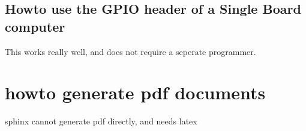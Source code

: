 \documentclass[letterpaper,10pt,english]{sphinxmanual}
\begin{document}
\subsection{Howto use the GPIO header of a Single Board computer}
\label{\detokenize{hacking/openocd:howto-use-the-gpio-header-of-a-single-board-computer}}
This works really well, and does not require a seperate programmer.

\begin{sphinxVerbatim}[commandchars=\\\{\}]
         
\end{sphinxVerbatim}


\section{howto generate pdf documents}
\label{\detokenize{hacking/latexpdf:howto-generate-pdf-documents}}\label{\detokenize{hacking/latexpdf::doc}}
sphinx cannot generate pdf directly, and needs latex

\begin{sphinxVerbatim}[commandchars=\\\{\}]
  
  
  
  
  
  
\end{sphinxVerbatim}
\end{document}
